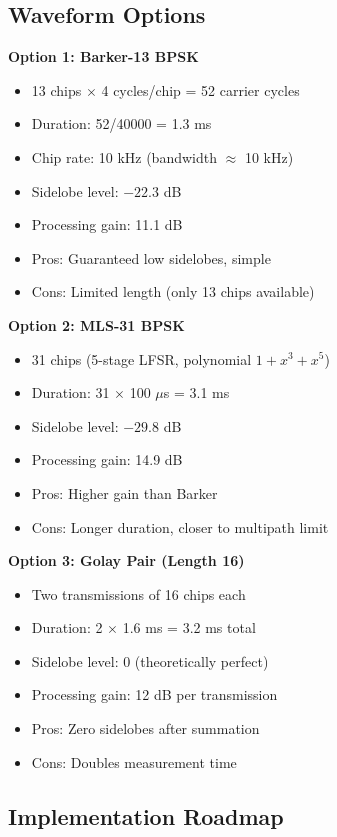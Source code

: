 \documentclass[11pt]{article}
\begin{document}
\subsection{Waveform Options}

\textbf{Option 1: Barker-13 BPSK}
\begin{itemize}
    \item 13 chips $\times$ 4 cycles/chip = 52 carrier cycles
    \item Duration: 52/40000 = 1.3 ms
    \item Chip rate: 10 kHz (bandwidth $\approx$ 10 kHz)
    \item Sidelobe level: $-22.3$ dB
    \item Processing gain: 11.1 dB
    \item Pros: Guaranteed low sidelobes, simple
    \item Cons: Limited length (only 13 chips available)
\end{itemize}

\textbf{Option 2: MLS-31 BPSK}
\begin{itemize}
    \item 31 chips (5-stage LFSR, polynomial $1 + x^3 + x^5$)
    \item Duration: 31 $\times$ 100 $\mu$s = 3.1 ms
    \item Sidelobe level: $-29.8$ dB
    \item Processing gain: 14.9 dB
    \item Pros: Higher gain than Barker
    \item Cons: Longer duration, closer to multipath limit
\end{itemize}

\textbf{Option 3: Golay Pair (Length 16)}
\begin{itemize}
    \item Two transmissions of 16 chips each
    \item Duration: 2 $\times$ 1.6 ms = 3.2 ms total
    \item Sidelobe level: 0 (theoretically perfect)
    \item Processing gain: 12 dB per transmission
    \item Pros: Zero sidelobes after summation
    \item Cons: Doubles measurement time
\end{itemize}

\subsection{Implementation Roadmap}
\end{document}
